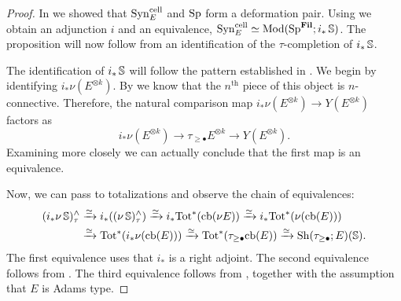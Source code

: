\begin{proof}
  In  we showed that $\mathrm{Syn}_E^{\mathrm{cell}}$ and $\operatorname{\mathrm{Sp}}$
  form a deformation pair. Using  we obtain an adjunction $i$ and an equivalence,
  $ \mathrm{Syn}_E^{\mathrm{cell}} \simeq \mathrm{Mod}( \operatorname{\mathrm{Sp}}^{\operatorname{\mathbf{Fil}}} ; i_*\operatorname{\mathbb{S}})$. The proposition will now follow from an identification of the $\tau$-completion of $i_*\operatorname{\mathbb{S}}$. 
  
  The identification of $i_*\operatorname{\mathbb{S}}$ will follow the pattern established in .  
  We begin by identifying $i_* \nu (E^{\otimes k})$.
  By \cite[Proposition 4.21]{Pstragowski} we know that the $n^{\mathrm{th}}$ piece of this object is $n$-connective. Therefore, the natural comparison map $i_* \nu (E^{\otimes k}) \to Y(E^{\otimes k})$ factors as
  \[ i_*\nu ( E^{\otimes k} ) \to \tau_{\geq \bullet} E^{\otimes k} \to Y(E^{\otimes k}). \]
  Examining \cite[Proposition 4.21]{Pstragowski} more closely we can actually conclude that the first map is an equivalence.
  
  Now, we can pass to totalizations and observe the chain of equivalences:
  \begin{align*}
    (i_*\nu \operatorname{\mathbb{S}})_\tau^{\wedge}
    &\xrightarrow{\simeq} i_*((\nu \operatorname{\mathbb{S}})_\tau^{\wedge})
    \xrightarrow{\simeq} i_* \mathrm{Tot}^* (\mathrm{cb}(\nu E)) 
    \xrightarrow{\simeq} i_* \mathrm{Tot}^* (\nu (\mathrm{cb}(E))) \\
    &\xrightarrow{\simeq} \mathrm{Tot}^* (i_* \nu (\mathrm{cb}(E)))
    \xrightarrow{\simeq} \mathrm{Tot}^* (\tau_{\geq \bullet} \mathrm{cb}(E))
    \xrightarrow{\simeq} \mathrm{Sh}(\tau_{\geq \bullet} ; E)(\operatorname{\mathbb{S}}). 
  \end{align*}  
  The first equivalence uses that $i_*$ is a right adjoint.
  The second equivalence follows from \cite[Proposition A.11]{Boundaries}.
  The third equivalence follows from \cite[Lemma 4.24]{Pstragowski}, together with the assumption that $E$ is Adams type.
\end{proof}  





